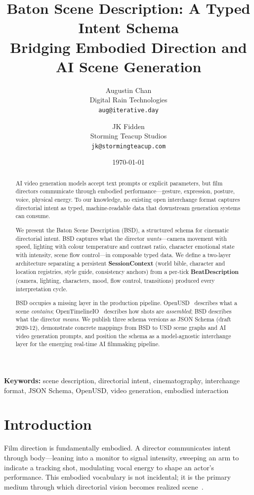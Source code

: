 \documentclass{article}
\title{Baton Scene Description: A Typed Intent Schema\\Bridging Embodied Direction and AI Scene Generation}
\author{
  Augustin Chan\\
  Digital Rain Technologies\\
  \texttt{aug@iterative.day}
  \and
  JK Fidden\\
  Storming Teacup Studios\\
  \texttt{jk@stormingteacup.com}
}
\date{\today}
\begin{document}
\maketitle

\begin{abstract}
AI video generation models accept text prompts or explicit parameters, but film directors communicate through embodied performance---gesture, expression, posture, voice, physical energy. To our knowledge, no existing open interchange format captures directorial intent as typed, machine-readable data that downstream generation systems can consume.

We present the Baton Scene Description (BSD), a structured schema for cinematic directorial intent. BSD captures what the director \emph{wants}---camera movement with speed, lighting with colour temperature and contrast ratio, character emotional state with intensity, scene flow control---in composable typed data. We define a two-layer architecture separating a persistent \textbf{SessionContext} (world bible, character and location registries, style guide, consistency anchors) from a per-tick \textbf{BeatDescription} (camera, lighting, characters, mood, flow control, transitions) produced every interpretation cycle.

BSD occupies a missing layer in the production pipeline. OpenUSD~\cite{openusd2016} describes what a scene \emph{contains}; OpenTimelineIO~\cite{otio2018} describes how shots are \emph{assembled}; BSD describes what the director \emph{means}. We publish three schema versions as JSON Schema (draft 2020-12), demonstrate concrete mappings from BSD to USD scene graphs and AI video generation prompts, and position the schema as a model-agnostic interchange layer for the emerging real-time AI filmmaking pipeline.
\end{abstract}

\textbf{Keywords:} scene description, directorial intent, cinematography, interchange format, JSON Schema, OpenUSD, video generation, embodied interaction

\section{Introduction}\label{sec:introduction}

Film direction is fundamentally embodied. A director communicates intent through body---leaning into a monitor to signal intensity, sweeping an arm to indicate a tracking shot, modulating vocal energy to shape an actor's performance. This embodied vocabulary is not incidental; it is the primary medium through which directorial vision becomes realized scene~\cite{katz2019}.
\end{document}
